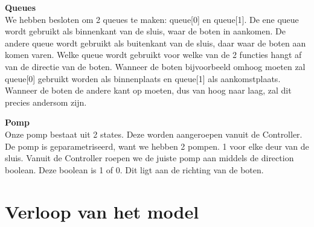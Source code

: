 \documentclass[oneside]{scrbook}
\begin{document}
\textbf{Queues} \\
We hebben besloten om 2 queues te maken: queue[0] en queue[1]. De ene queue wordt gebruikt als binnenkant van de sluis, waar de boten in aankomen. De andere queue wordt gebruikt als buitenkant van de sluis, daar waar de boten aan komen varen. Welke queue wordt gebruikt voor welke van de 2 functies hangt af van de directie van de boten. Wanneer de boten bijvoorbeeld omhoog moeten zal queue[0] gebruikt worden als binnenplaats en queue[1] als aankomstplaats. Wanneer de boten de andere kant op moeten, dus van hoog naar laag, zal dit precies andersom zijn.

\textbf{Pomp} \\
Onze pomp bestaat uit 2 states. Deze worden aangeroepen vanuit de Controller. De pomp is geparametriseerd, want we hebben 2  pompen. 1 voor elke deur van de sluis. Vanuit de Controller roepen we de juiste pomp aan middels de direction boolean. Deze boolean is 1 of 0. Dit ligt aan de richting van de boten.

\section{Verloop van het model}
\end{document}
